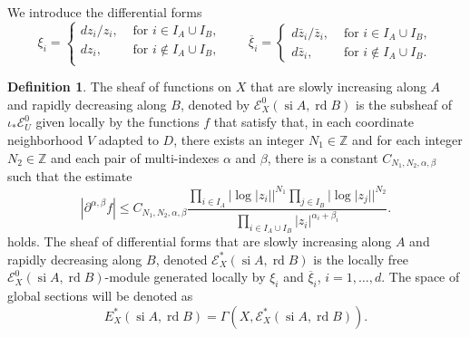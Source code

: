 \documentclass[11pt,a4paper]{amsart}
\newcommand{\Z}{\mathds{Z}}
\newcommand{\sE}{\mathscr{E}}
\DeclareMathOperator{\si}{si}
\DeclareMathOperator{\rd}{rd}
\numberwithin{equation}{section}
\theoremstyle{plain}
\theoremstyle{definition}
\newtheorem{df}[prop]{Definition}
\begin{document}
We introduce the differential forms
\begin{equation}\label{eq:13}
  \xi_i =
  \begin{cases}
    dz_i/z_i,&\text{ for }i\in I_A\cup I_B,\\
    dz_i,&\text{ for }i\not \in I_A\cup I_B,\\    
  \end{cases}
  \qquad
  \overline{\xi}_i =
  \begin{cases}
    d\bar z_i/\bar z_i,&\text{ for }i\in I_A\cup I_B,\\
    d \bar z_i,&\text{ for }i\not \in I_A\cup I_B.
  \end{cases}
\end{equation}

\begin{df}\label{def:3} The sheaf of functions on $X$ that are
  slowly increasing along $A$ and rapidly decreasing along $B$,
  denoted by $\sE^0_{X}(\si A,\rd B)$ is the
  subsheaf of $\iota_\ast\sE^0_U$ given locally by the functions $f$ that
  satisfy that, in each coordinate neighborhood $V$ adapted to $D$,
  there exists an integer $N_1\in \Z$ and for each integer $N_2\in \Z$
  and each pair of multi-indexes $\alpha $ and $\beta $, there is a
  constant $C_{N_1,N_2,\alpha ,\beta }$ such that the estimate
  \begin{equation}\label{eq:15}
    \left |
      \partial^{\alpha ,\beta }f
    \right|\le C_{N_1,N_2,\alpha ,\beta }
    \frac{\prod_{i\in I_A}|\log|z_i||^{N_1}
      \prod_{j\in I_B}|\log|z_j||^{N_2}}
    {\prod_{i\in I_{A}\cup I_{B}}|z_{i}|^{\alpha _{i}+\beta _{i}}}.
  \end{equation}
  holds. The sheaf of differential forms that are slowly increasing
  along $A$ and rapidly decreasing along $B$, denoted $\sE_{X}^\ast(\si
  A,\rd B)$ is the locally free
  $\sE_{X}^0(\si A,\rd B)$-module generated locally by $\xi_{i}$ and
  $\overline {\xi}_{i}$, $i=1,\dots,d$. The space of global sections
  will be denoted as
  \begin{displaymath}
    E_{X}^{\ast}(\si A,\rd B)=\Gamma (X, \sE_{X}^\ast(\si A,\rd B)).
  \end{displaymath}
\end{df}
\end{document}
